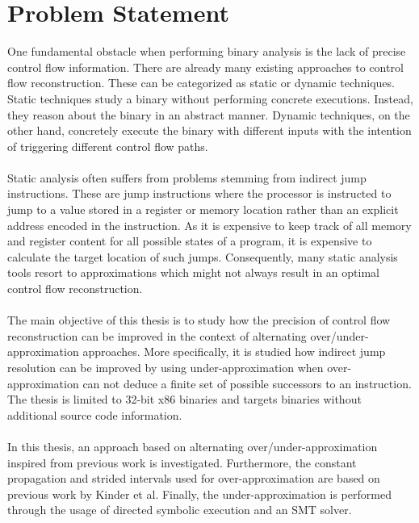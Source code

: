 \documentclass{kththesis}
\begin{document}
\section{Problem Statement}
One fundamental obstacle when performing binary analysis is the lack of precise control flow information. There are already many existing approaches to control flow reconstruction. These can be categorized as static or dynamic techniques. Static techniques study a binary without performing concrete executions. Instead, they reason about the binary in an abstract manner. Dynamic techniques, on the other hand, concretely execute the binary with different inputs with the intention of triggering different control flow paths. 
\\ \\ 
Static analysis often suffers from problems stemming from indirect jump instructions. These are jump instructions where the processor is instructed to jump to a value stored in a register or memory location rather than an explicit address encoded in the instruction. As it is expensive to keep track of all memory and register content for all possible states of a program, it is expensive to calculate the target location of such jumps. Consequently, many static analysis tools resort to approximations which might not always result in an optimal control flow reconstruction.
\\ \\
The main objective of this thesis is to study how the precision of control flow reconstruction can be improved in the context of alternating over/under-approximation approaches. More specifically, it is studied how indirect jump resolution can be improved by using under-approximation when over-approximation can not deduce a finite set of possible successors to an instruction. The thesis is limited to 32-bit x86 binaries and targets binaries without additional source code information.
\\ \\
In this thesis, an approach based on alternating over/under-approximation inspired from previous work\cite{alternating} is investigated. Furthermore, the constant propagation and strided intervals used for over-approximation are based on previous work by Kinder et al\cite{Jakstab}. Finally, the under-approximation is performed through the usage of directed symbolic execution and an SMT solver. 
\end{document}
